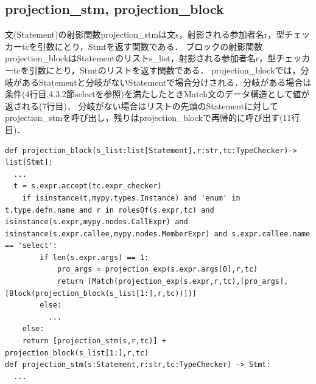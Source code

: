 \documentclass{thesis}
\begin{document}
\subsection{projection\_stm, projection\_block}
文(Statement)の射影関数projection\_stmは文\textsf{s}，射影される参加者名\textsf{r}，型チェッカー\textsf{tc}を引数にとり，\textsf{Stmt}を返す関数である．
ブロックの射影関数projection\_blockはStatementのリスト\textsf{s\_list}，射影される参加者名\textsf{r}，型チェッカー\textsf{tc}を引数にとり，\textsf{Stmt}のリストを返す関数である．
projection\_blockでは，分岐があるStatementと分岐がないStatementで場合分けされる．分岐がある場合は条件(4行目,4.3.2節selectを参照)を満たしたときMatch文のデータ構造として値が返される(7行目)．
分岐がない場合はリストの先頭のStatementに対してprojection\_stmを呼び出し，残りはprojection\_blockで再帰的に呼び出す(11行目)．
\begin{lstlisting}[caption=pro\_s.py]
def projection_block(s_list:list[Statement],r:str,tc:TypeChecker)-> list[Stmt]:
  ... 
  t = s.expr.accept(tc.expr_checker) 
    if isinstance(t,mypy.types.Instance) and 'enum' in t.type.defn.name and r in rolesOf(s.expr,tc) and isinstance(s.expr,mypy.nodes.CallExpr) and isinstance(s.expr.callee,mypy.nodes.MemberExpr) and s.expr.callee.name == 'select':
        if len(s.expr.args) == 1:
            pro_args = projection_exp(s.expr.args[0],r,tc)
            return [Match(projection_exp(s.expr,r,tc),[pro_args],[Block(projection_block(s_list[1:],r,tc))])]
        else:
          ... 
    else:
    return [projection_stm(s,r,tc)] + projection_block(s_list[1:],r,tc) 
def projection_stm(s:Statement,r:str,tc:TypeChecker) -> Stmt:
  ... 
\end{lstlisting}
\end{document}
